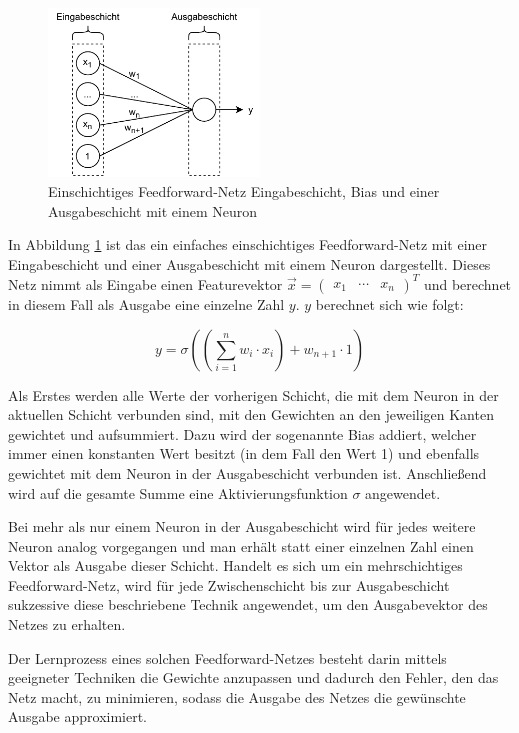 \begin{figure}[htbp]
\centerline{\includegraphics[width=0.5\textwidth]{content/images/FFNN.pdf}}
\caption{Einschichtiges Feedforward-Netz Eingabeschicht, Bias und einer Ausgabeschicht mit einem Neuron}
\label{f2.1}
\end{figure}

In Abbildung \ref{f2.1} ist das ein einfaches einschichtiges Feedforward-Netz mit einer Eingabeschicht und einer Ausgabeschicht mit einem Neuron dargestellt. Dieses Netz nimmt als Eingabe einen Featurevektor $\vec{x} = \left(\begin{array}{ccc} x_1 & \cdots & x_n \end{array} \right)^T$ und berechnet in diesem Fall als Ausgabe eine einzelne Zahl $y$. $y$ berechnet sich wie folgt:

\begin{equation}
y = \sigma \left( \left( \sum_{i=1}^{n} w_i \cdot x_i \right) + w_{n+1} \cdot 1 \right)
\label{eq2.1}
\end{equation} 

Als Erstes werden alle Werte der vorherigen Schicht, die mit dem Neuron in der aktuellen Schicht verbunden sind, mit den Gewichten an den jeweiligen Kanten gewichtet und aufsummiert. Dazu wird der sogenannte Bias addiert, welcher immer einen konstanten Wert besitzt (in dem Fall den Wert 1) und ebenfalls gewichtet mit dem Neuron in der Ausgabeschicht verbunden ist. Anschließend wird auf die gesamte Summe eine Aktivierungsfunktion $\sigma$ angewendet.

Bei mehr als nur einem Neuron in der Ausgabeschicht wird für jedes weitere Neuron analog vorgegangen und man erhält statt einer einzelnen Zahl einen Vektor als Ausgabe dieser Schicht. Handelt es sich um ein mehrschichtiges Feedforward-Netz, wird für jede Zwischenschicht bis zur Ausgabeschicht sukzessive diese beschriebene Technik angewendet, um den Ausgabevektor des Netzes zu erhalten.

Der Lernprozess eines solchen Feedforward-Netzes besteht darin mittels geeigneter Techniken die Gewichte anzupassen und dadurch den Fehler, den das Netz macht, zu minimieren, sodass die Ausgabe des Netzes die gewünschte Ausgabe approximiert.


